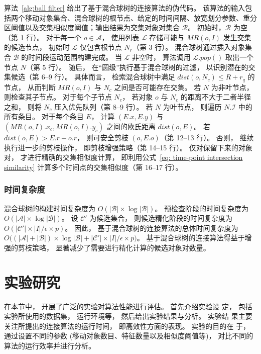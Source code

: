 算法~\ref{alg:ball filter} 给出了基于混合球树的连接算法的伪代码。 该算法的输入包括两个移动对象集合、混合球树的根节点、给定的时间间隔、放宽划分参数、重分区阈值以及交集相似度阈值；输出结果为交集对象对集合 $\mathcal{R}$。 初始时，$\mathcal{R}$ 为空（第 1 行）。 对于每一个 $o\in\mathcal{A}$， 使用列表 $\mathcal{L}$ 存储可能与 $MR(o,I)$ 发生交集的候选节点， 初始时 $\mathcal{L}$ 仅包含根节点 $N_r$（第 3 行）。 混合球树通过插入对象集合 $\mathcal{B}$ 的时间段运动范围构建完成。 当 $\mathcal{L}$ 非空时， 算法调用 $\mathcal{L}.pop()$ 取出一个节点 $N$（第 5 行）。 随后， 在``圆级''执行基于混合球树的过滤， 以识别潜在的交集候选（第 6--9 行）。 具体而言， 检索混合球树中满足 $dist(o,N_c)\leq R+r_q$ 的节点， 从而判断 $MR(o,I)$ 与 $N_c$ 之间是否可能存在交集。 若 $N$ 为非叶节点， 则检查其子节点。 对于每个子节点 $N_c$， 若对象 $o$ 与 $N_c$ 的距离不大于二者半径之和， 则将 $N_c$ 压入优先队列（第 8--9 行）。 若 $N$ 为叶节点， 则遍历 $N.\mathcal{I}$ 中的所有条目。 对于每个条目 $E$， 计算 $(E.x,E.y)$ 与 $(MR(o,I).x_c,MR(o,I).y_c)$ 之间的欧氏距离 $dist(o,E)$。 若 $dist(o,E)>E.r+o.r$， 则可安全剪枝 $(o,E.o)$（第 12--13 行）。 否则， 继续执行进一步的剪枝操作， 即剪枝增强策略（第 14--15 行）。 仅对保留下来的对象对， 才进行精确的交集相似度计算， 即利用公式~\eqref{eq: time-point intersection similarity} 计算多个时间点的交集相似度（第 16--17 行）。%

\subsubsection*{时间复杂度}
混合球树的构建时间复杂度为 $O(|\mathcal{B}|\times \log|\mathcal{B}|)$。 预检查阶段的时间复杂度为 $O(|\mathcal{A}|\times\log|\mathcal{B}|)$。 设 $\mathcal{C}'$ 为候选集合， 则候选精化阶段的时间复杂度为 $O(|\mathcal{C}'|\times |I|/\epsilon\times p)$。 因此， 基于混合球树的连接算法的总体时间复杂度为
$
O\big((|\mathcal{A}|+|\mathcal{B}|)\times\log|\mathcal{B}| + |\mathcal{C}'|\times |I|/\epsilon\times p\big)
$。 基于混合球树的连接算法得益于增强的剪枝策略， 显著减少了需要进行精化计算的候选对象对数量。











\section{实验研究}
在本节中， 开展了广泛的实验对算法性能进行评估。 首先介绍实验设
定， 包括实验所使用的数据集， 运行环境等， 然后给出实验结果与分析。 实验结
果主要关注所提出的连接算法的运行时间， 即高效性方面的表现。 实验的目的在
于， 通过设置不同的参数 (移动对象数目、特征数量以及相似度阈值等)， 对比不同的算法的运行效率并进行分析。

